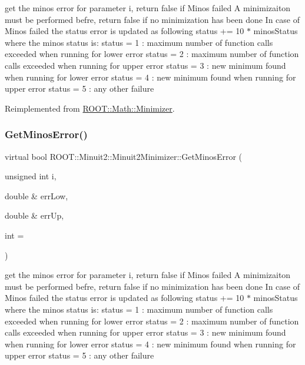 get the minos error for parameter i, return false if Minos failed A minimizaiton must be performed befre, return false if no minimization has been done In case of Minos failed the status error is updated as following status += 10 $\ast$ minos\+Status where the minos status is\+: status = 1 \+: maximum number of function calls exceeded when running for lower error status = 2 \+: maximum number of function calls exceeded when running for upper error status = 3 \+: new minimum found when running for lower error status = 4 \+: new minimum found when running for upper error status = 5 \+: any other failure 

Reimplemented from \mbox{\hyperlink{classROOT_1_1Math_1_1Minimizer_aeaef75b766eff7088939259c842ab056}{R\+O\+O\+T\+::\+Math\+::\+Minimizer}}.

\mbox{\label{classROOT_1_1Minuit2_1_1Minuit2Minimizer_ab6c27c6f165821774dd304561e8956f5}} 
\subsubsection{\texorpdfstring{GetMinosError()}{GetMinosError()}\hspace{0.1cm}{\footnotesize\ttfamily [3/3]}}
{\footnotesize\ttfamily virtual bool R\+O\+O\+T\+::\+Minuit2\+::\+Minuit2\+Minimizer\+::\+Get\+Minos\+Error (\begin{DoxyParamCaption}\item[{unsigned int}]{i,  }\item[{double \&}]{err\+Low,  }\item[{double \&}]{err\+Up,  }\item[{int}]{ = {} }\end{DoxyParamCaption})\hspace{0.3cm}{\ttfamily [virtual]}}

get the minos error for parameter i, return false if Minos failed A minimizaiton must be performed befre, return false if no minimization has been done In case of Minos failed the status error is updated as following status += 10 $\ast$ minos\+Status where the minos status is\+: status = 1 \+: maximum number of function calls exceeded when running for lower error status = 2 \+: maximum number of function calls exceeded when running for upper error status = 3 \+: new minimum found when running for lower error status = 4 \+: new minimum found when running for upper error status = 5 \+: any other failure 


